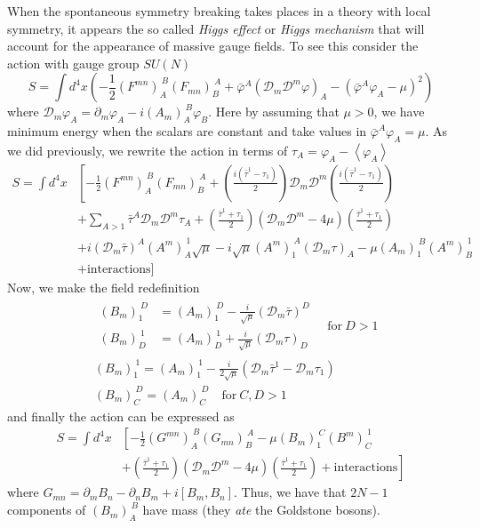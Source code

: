 \documentclass[a4paper,12pt]{article}
\numberwithin{equation}{section}
\numberwithin{exe}{section}
\newcommand{\p}{{\partial}}
\newcommand{\Dc}{{\mathcal D}}
\newcommand{\m}{{\mu}}
\newcommand{\vphi}{{\varphi}}
\newcommand{\vphib}{{\bar\varphi}}
\newcommand{\taub}{{\bar\tau}}
\begin{document}
When the spontaneous symmetry breaking takes places in a theory with local symmetry, it appears the so called {\it Higgs effect} or {\it Higgs mechanism} that will account for the appearance of massive gauge fields. To see this consider the action with gauge group $SU(N)$
	\begin{equation}
	S = \int d^4x \left( -\frac12 (F^{mn})_A^{\ B} (F_{mn})_B^{\ A} + \vphib^A (\Dc_m\Dc^m\vphi)_A - (\vphib^A\vphi_A - \m)^2\right)
	\end{equation}
where $\Dc_m\vphi_A = \p_m\vphi_A - i(A_m)_A^{\ B} \vphi_B$. Here by assuming that $\m>0$, we have minimum energy when the scalars are constant and take values in $ \vphib^A\vphi_A=\m$. As we did previously, we rewrite the action in terms of $\tau_A = \vphi_A - \left<\vphi_A\right>$
	\begin{align}
	S = \int d^4x & \left[ -\frac12 (F^{mn})_A^{\ B} (F_{mn})_B^{\ A} + \left(\frac{i(\taub^1-\tau_1)}{2}\right)\Dc_m\Dc^m\left(\frac{i(\taub^1-\tau_1)}{2}\right) \right. \nonumber \\
	& + \sum_{A>1}\taub^A\Dc_m\Dc^m\tau_A + \left(\frac{\taub^1 + \tau_1}{2}\right)(\Dc_m\Dc^m - 4\m)\left(\frac{\taub^1 + \tau_1}{2}\right) \nonumber \\
	& + i(\Dc_m\taub)^A (A^m)_A^{\ 1}\sqrt\m - i\sqrt\m (A^m)_1^{\ A}(\Dc_m\tau)_A - \m (A_m)_1^{\ B} (A^m)_B^{\ 1} \nonumber \\
	& + \text{interactions} \Big]
	\end{align}
Now, we make the field redefinition
	\begin{align}
		&\begin{aligned}
		(B_m)_1^{\ D} & = (A_m)_1^{\ D}-\frac{i}{\sqrt\m}(\Dc_m\taub)^D \\
		(B_m)_D^{\ 1} & = (A_m)_D^{\ 1} + \frac{i}{\sqrt\m} (\Dc_m\tau)_D
		\end{aligned}\quad\text{for}\ D>1 \\
		&(B_m)_1^{\ 1} = (A_m)_1^{\ 1} - \frac{i}{2\sqrt\m} (\Dc_m \taub^1 -\Dc_m\tau_1)\\
		&(B_m)_C^{\ D} = (A_m)_C^{\ D} \quad\text{for}\ C,D> 1
	\end{align}
and finally the action can be expressed as
	\begin{align}
	S = \int d^4x & \left[ -\frac12 (G^{mn})_A^{\ B} (G_{mn})_B^{\ A} - \m(B_m)_1^{\ C}(B^m)_C^{\ 1} \right. \nonumber \\
	& \left. + \left(\frac{\taub^1 + \tau_1}{2}\right)(\Dc_m\Dc^m - 4\m)\left(\frac{\taub^1 + \tau_1}{2}\right) + \text{interactions} \right]
	\end{align}
where $G_{mn} = \p_m B_n - \p_n B_m + i[B_m, B_n]$. Thus, we have that $2N-1$ components of $(B_m)_A^{\ B}$ have mass (they {\it ate} the Goldstone bosons).
\end{document}
